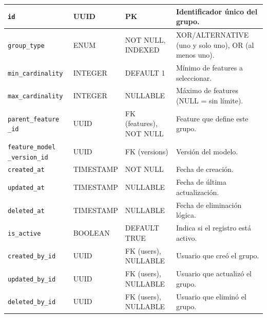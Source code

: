 {{{\begin{longtable}{|p{}|p{}|p{}|p{}|}
                \texttt{id} & UUID & PK & Identificador único del grupo. \\
                \hline
                \rowcolor[HTML]{EDEBF1}
                \texttt{group\_type} & ENUM & NOT NULL, INDEXED & XOR/ALTERNATIVE (uno y solo uno), OR (al menos uno). \\
                \hline
                \texttt{min\_cardinality} & INTEGER & DEFAULT 1 & Mínimo de features a seleccionar. \\
                \hline
                \rowcolor[HTML]{EDEBF1}
                \texttt{max\_cardinality} & INTEGER & NULLABLE & Máximo de features (NULL = sin límite). \\
                \hline
                \texttt{parent\_feature 
                \_id} & UUID & FK (features), NOT NULL & Feature que define este grupo. \\
                \hline
                \rowcolor[HTML]{EDEBF1}
                \texttt{feature\_model 
                \_version\_id} & UUID & FK (versions) & Versión del modelo. \\
                \hline
                \texttt{created\_at} & TIMESTAMP & NOT NULL & Fecha de creación. \\
                \hline
                \rowcolor[HTML]{EDEBF1}
                \texttt{updated\_at} & TIMESTAMP & NULLABLE & Fecha de última actualización. \\
                \hline
                \texttt{deleted\_at} & TIMESTAMP & NULLABLE & Fecha de eliminación lógica. \\
                \hline
                \rowcolor[HTML]{EDEBF1}
                \texttt{is\_active} & BOOLEAN & DEFAULT TRUE & Indica si el registro está activo. \\
                \hline
                \texttt{created\_by\_id} & UUID & FK (users), NULLABLE & Usuario que creó el grupo. \\
                \hline
                \rowcolor[HTML]{EDEBF1}
                \texttt{updated\_by\_id} & UUID & FK (users), NULLABLE & Usuario que actualizó el grupo. \\
                \hline
                \texttt{deleted\_by\_id} & UUID & FK (users), NULLABLE & Usuario que eliminó el grupo. \\
                \hline
            \end{longtable}

}}}
